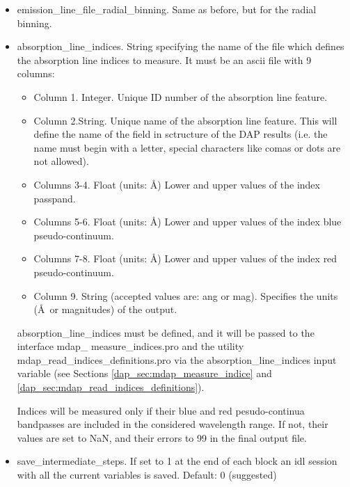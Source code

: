 \begin{itemize}
 \item emission\_line\_file\_radial\_binning. Same as before, but for
   the radial binning.

 \item absorption\_line\_indices. String specifying the name of the
   file which defines the absorption line indices to measure. It must
   be an ascii file with 9 columns:

   \begin{itemize}

     \item Column 1. Integer. Unique ID number of the absorption line
       feature.

     \item Column 2.String. Unique name of the absorption line
       feature. This will define the name of the field in sctructure
       of the DAP results (i.e. the name must begin with a letter,
       special characters like comas or dots are not allowed).

     \item Columns 3-4. Float (units: \AA) Lower and upper values of
       the index passpand.

     \item Columns 5-6.  Float (units: \AA) Lower and upper values of
       the index blue pseudo-continuum.

     \item Columns 7-8.  Float (units: \AA) Lower and upper values of
       the index red pseudo-continuum.

     \item Column 9. String (accepted values are: ang or
       mag). Specifies the units (\AA\ or magnitudes) of the output.
 
    \end{itemize}
      
   absorption\_line\_indices must be defined, and it will be passed to
   the interface mdap\_ measure\_indices.pro and the utility
   mdap\_read\_indices\_definitions.pro via the
   absorption\_line\_indices input variable (see Sections
   \ref{dap_sec:mdap_measure_indice} and
   \ref{dap_sec:mdap_read_indices_definitions}).

   Indices will be measured only if their blue and red pesudo-continua
   bandpasses are included in the considered wavelength range. If not,
   their values are set to NaN, and their errors to 99 in the final
   output file.

  \item save\_intermediate\_steps. If set to 1 at the end of each
    block an idl session with all the current variables is
    saved. Default: 0 (suggested)


\end{itemize}
